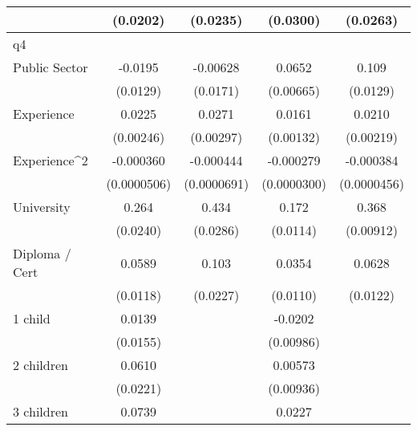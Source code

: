 {\begin{tabular}{l*{4}{c}}
                    &    (0.0202)         &    (0.0235)         &    (0.0300)         &    (0.0263)         \\
\hline
q4                  &                     &                     &                     &                     \\
Public Sector       &     -0.0195         &    -0.00628         &      0.0652\sym{***}&       0.109\sym{***}\\
                    &    (0.0129)         &    (0.0171)         &   (0.00665)         &    (0.0129)         \\
[1em]
Experience          &      0.0225\sym{***}&      0.0271\sym{***}&      0.0161\sym{***}&      0.0210\sym{***}\\
                    &   (0.00246)         &   (0.00297)         &   (0.00132)         &   (0.00219)         \\
[1em]
Experience^{2}      &   -0.000360\sym{***}&   -0.000444\sym{***}&   -0.000279\sym{***}&   -0.000384\sym{***}\\
                    & (0.0000506)         & (0.0000691)         & (0.0000300)         & (0.0000456)         \\
[1em]
University          &       0.264\sym{***}&       0.434\sym{***}&       0.172\sym{***}&       0.368\sym{***}\\
                    &    (0.0240)         &    (0.0286)         &    (0.0114)         &   (0.00912)         \\
[1em]
Diploma / Cert      &      0.0589\sym{***}&       0.103\sym{***}&      0.0354\sym{**} &      0.0628\sym{***}\\
                    &    (0.0118)         &    (0.0227)         &    (0.0110)         &    (0.0122)         \\
[1em]
1 child             &      0.0139         &                     &     -0.0202\sym{*}  &                     \\
                    &    (0.0155)         &                     &   (0.00986)         &                     \\
[1em]
2 children          &      0.0610\sym{**} &                     &     0.00573         &                     \\
                    &    (0.0221)         &                     &   (0.00936)         &                     \\
[1em]
3 children          &      0.0739\sym{*}  &                     &      0.0227         &                     \\

\end{tabular}}

